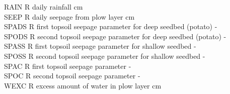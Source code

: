 \begin{tabbing}
$$RAIN\> \> R\> daily rainfall\> \> \> \> \> \> \> cm\\
SEEP\> \> R\> daily seepage from plow layer\> \> \> \> \> \> \> cm\\
SPADS   \> \> R\> first topsoil seepage parameter for deep seedbed (potato)\> \> \> \> \> \> \> -\\
SPODS\> \> R\> second topsoil seepage parameter for deep seedbed (potato)\> \> \> \> \> \> \> -\\
SPASS\> \> R\> first topsoil seepage parameter for shallow seedbed\> \> \> \> \> \> \> -\\
SPOSS\> \> R\> second topsoil seepage parameter for shallow seedbed\> \> \> \> \> \> \> -\\
SPAC\> \> R\> first topsoil seepage parameter\> \> \> \> \> \> \> -\\
SPOC\> \> R\> second topsoil seepage parameter\> \> \> \> \> \> \> -\\
WEXC\> \> R\> excess amount of water in plow layer\> \> \> \> \> \> \> cm
\end{tabbing}


